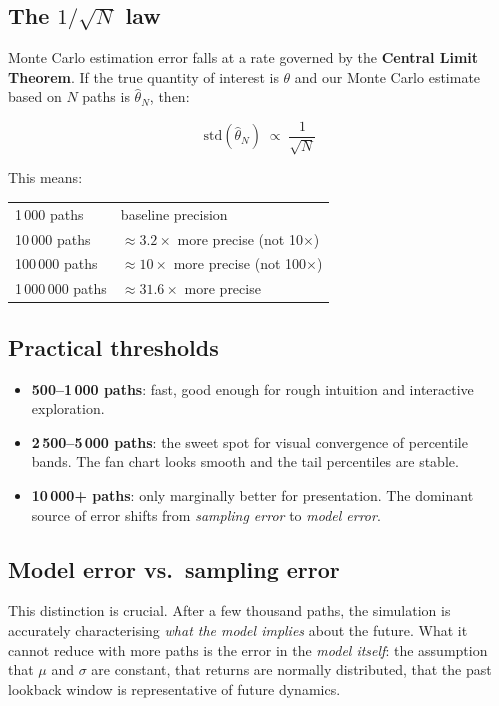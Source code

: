 \documentclass[11pt, a4paper]{article}
\begin{document}
\subsection*{The $1/\sqrt{N}$ law}

Monte Carlo estimation error falls at a rate governed by the \textbf{Central Limit Theorem}. If the true quantity of interest is $\theta$ and our Monte Carlo estimate based on $N$ paths is $\hat\theta_N$, then:

\[
  \mathrm{std}(\hat\theta_N) \;\propto\; \frac{1}{\sqrt{N}}
\]

This means:

\begin{tcolorbox}[mathbox]
\begin{tabular}{ll}
  1\,000 paths  & baseline precision  \\
  10\,000 paths & $\approx 3.2\times$ more precise (not 10$\times$) \\
  100\,000 paths & $\approx 10\times$ more precise (not 100$\times$) \\
  1\,000\,000 paths & $\approx 31.6\times$ more precise  \\
\end{tabular}
\end{tcolorbox}

\subsection*{Practical thresholds}

\begin{itemize}[leftmargin=2em]
  \item \textbf{500–1\,000 paths}: fast, good enough for rough intuition and interactive exploration.
  \item \textbf{2\,500–5\,000 paths}: the sweet spot for visual convergence of percentile bands. The fan chart looks smooth and the tail percentiles are stable.
  \item \textbf{10\,000+ paths}: only marginally better for presentation. The dominant source of error shifts from \emph{sampling error} to \emph{model error}.
\end{itemize}

\subsection*{Model error vs.\ sampling error}

This distinction is crucial. After a few thousand paths, the simulation is accurately characterising \emph{what the model implies} about the future. What it cannot reduce with more paths is the error in the \emph{model itself}: the assumption that $\mu$ and $\sigma$ are constant, that returns are normally distributed, that the past lookback window is representative of future dynamics.
\end{document}
